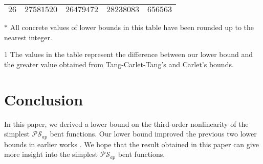 \documentclass[preprint,10pt]{elsarticle}
\newcommand{\0}{\textbf{0}}
\newcommand{\1}{\textbf{1}}
\theoremstyle{plain}
\begin{document}
\begin{table}
\begin{threeparttable}
\begin{tabular}{|c|c|c|c|c|}
                $26 $ &  $ 27581520    $       & $ 26479472 $     & $ 28238083 $     & $  656563  $ \\  \hline
            \end{tabular}
            \begin{tablenotes}
                \footnotesize
                \item[$\ast$] All concrete values of lower bounds in this table have been rounded up to the nearest integer.
                \item[1] The values in the table represent  the difference between our lower bound and the greater value obtained from Tang-Carlet-Tang's and Carlet's bounds.
            \end{tablenotes}
        \end{threeparttable}
        \label{table:MyTableLabel}
    \end{table}


\section{Conclusion}
    In this paper, we derived a lower bound on the third-order nonlinearity of the simplest $\mathcal{PS}_{ap}$ bent functions.
    Our lower bound improved the previous two lower bounds in earlier works \cite{Carlet2011NL_Profile_Dillon,TangCT2013NL_2bent}.
    We hope that the result obtained in this paper can give  more insight into the simplest $\mathcal{PS}_{ap}$ bent functions.



\end{document}
